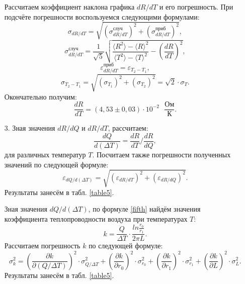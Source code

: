 \documentclass[a4paper, 12pt]{article}
\begin{document}
\begin{enumerate}
        Рассчитаем коэффициент наклона графика $dR / dT$ и его погрешность. При подсчёте погрешности воспользуемся следующими формулами:
        \begin{equation}
            \sigma_{dR / dT} = \sqrt{(\sigma_{dR / dT}^{случ})^2 + (\sigma_{dR / dT}^{приб})^2},
        \end{equation}
        \begin{equation}
            \sigma_{dR / dT}^{случ} = \frac{1}{\sqrt{5}} \sqrt{\frac{\langle R^2 \rangle - \langle R \rangle^2}{\langle T^2 \rangle - \langle T \rangle^2} - (\frac{dR}{dT})^2},
        \end{equation}
        \begin{equation}
            \varepsilon_{dR / dT}^{приб} = \varepsilon_{T_2 - T_1},
        \end{equation}
        \begin{equation}
            \sigma_{T_2 - T_1} = \sqrt{(\sigma_{T_1})^2 + (\sigma_{T_2})^2} = \sqrt{2} \cdot \sigma_T.
        \end{equation}
        Окончательно получим:
        \begin{equation}
            \frac{dR}{dT} = (4,53 \pm 0,03) \cdot 10^{-2} \text{ } \frac{Ом}{К}.
        \end{equation}
        
        \item[3.] Зная значения $dR / dQ$ и $dR / dT$, рассчитаем:
        \begin{equation}
            \frac{dQ}{d(\Delta T)} = \frac{dR}{dT} / \frac{dR}{dQ},
        \end{equation}
        для различных температур $T$. Посчитаем также погрешности полученных значений по следующей формуле:
        \begin{equation}
            \varepsilon_{dQ / d(\Delta T)} = \sqrt{(\varepsilon_{dR / dT})^2 + (\varepsilon_{dR / dQ})^2}.
        \end{equation}
        Результаты занесём в табл. \ref{table5}.
        
        Зная значения $dQ / d(\Delta T)$, по формуле \eqref{fifth} найдём значения коэффициента теплопроводности воздуха при температурах $T$:
        \begin{equation}
            k = \frac{Q}{\Delta T} \cdot \frac{ln \frac{r_0}{r_1}}{2 \pi L}.
        \end{equation}
        Рассчитаем погрешность $k$ по следующей формуле:
        \begin{equation}
            \sigma_k^2 = (\frac{\partial k}{\partial (Q / \Delta T)})^2 \cdot \sigma_{Q / \Delta T}^2 + (\frac{\partial k}{\partial r_0})^2 \cdot \sigma_{r_0}^2 + (\frac{\partial k}{\partial r_1})^2 \cdot \sigma_{r_1}^2 + (\frac{\partial k}{\partial L})^2 \cdot \sigma_{L}^2.
        \end{equation}
        Результаты занесём в табл. \ref{table5}.
        

\end{enumerate}
\end{document}
